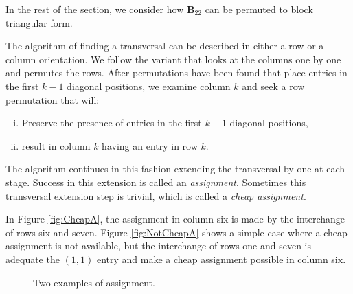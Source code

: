 \begin{rmk}
  In the rest of the section, we consider how $\mathbf{B}_{22}$ can be permuted
  to block triangular form.
\end{rmk}


\begin{defn}
  The algorithm of finding a transversal can be described in either a
  row or a column orientation. We follow the variant that looks at the
  columns one by one and permutes the rows.
  After permutations have been found that place entries in the first
  $k-1$ diagonal positions, we examine column $k$ and seek a row
  permutation that will:
  \begin{enumerate}[(i)]
  \item Preserve the presence of entries in the first $k-1$ diagonal
    positions,
  \item result in column $k$ having an entry in row $k$.
  \end{enumerate}
  The algorithm continues in this fashion extending the transversal by one at
  each stage. Success in this extension is called an
  \emph{assignment}. Sometimes this transversal extension step is
  trivial, which is called a \emph{cheap assignment}.
\end{defn}

\begin{exm}
  In Figure \ref{fig:CheapA}, the assignment in column six is made by
  the interchange of rows six and seven. Figure \ref{fig:NotCheapA}
  shows a simple case where a cheap assignment is not available, but
  the interchange of rows one and seven is adequate the $(1,1)$ entry
  and make a cheap assignment possible in column six.
  \begin{figure}[H]
  \centering
  \hspace{1cm}
  \caption{Two examples of assignment.}
  \label{fig:Assignment}
\end{figure}
\end{exm}

